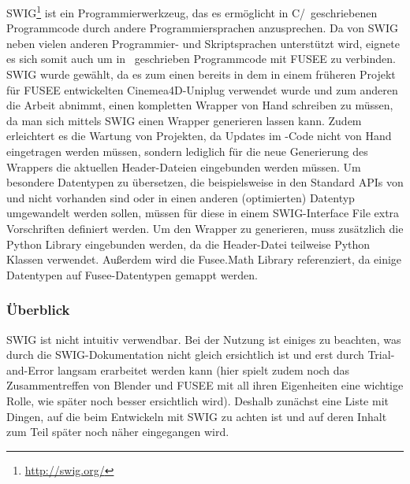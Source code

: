 \label{sec:SWIG}

SWIG\footnote{\url{http://swig.org/}} ist ein Programmierwerkzeug, das es ermöglicht in C/\CC~geschriebenen Programmcode durch andere Programmiersprachen anzusprechen. Da \CS von SWIG neben vielen anderen Programmier- und Skriptsprachen unterstützt wird, eignete es sich somit auch um in \CC~geschrieben Programmcode mit FUSEE zu verbinden. SWIG wurde gewählt, da es zum einen bereits in dem in einem früheren Projekt für FUSEE entwickelten Cinemea4D-Uniplug verwendet wurde und zum anderen die Arbeit abnimmt, einen kompletten Wrapper von Hand schreiben zu müssen, da man sich mittels SWIG einen Wrapper generieren lassen kann. Zudem erleichtert es die Wartung von Projekten, da Updates im \CC-Code nicht von Hand eingetragen werden müssen, sondern lediglich für die neue Generierung des Wrappers die aktuellen Header-Dateien eingebunden werden müssen. Um besondere Datentypen zu übersetzen, die beispielsweise in den Standard APIs von \CC und \CS nicht vorhanden sind oder in einen anderen (optimierten) Datentyp umgewandelt werden sollen, müssen für diese in einem SWIG-Interface File extra Vorschriften definiert werden.
Um den Wrapper zu generieren, muss zusätzlich die Python Library eingebunden werden, da die Header-Datei teilweise Python Klassen verwendet. Außerdem wird die Fusee.Math Library referenziert, da einige Datentypen auf Fusee-Datentypen gemappt werden.

\subsubsection{Überblick}
SWIG ist nicht intuitiv verwendbar. Bei der Nutzung ist einiges zu beachten, was durch die SWIG-Dokumentation nicht gleich ersichtlich ist und erst durch Trial-and-Error langsam erarbeitet werden kann (hier spielt zudem noch das Zusammentreffen von Blender und FUSEE mit all ihren Eigenheiten eine wichtige Rolle, wie später noch besser ersichtlich wird). Deshalb zunächst eine Liste mit Dingen, auf die beim Entwickeln mit SWIG zu achten ist und auf deren Inhalt zum Teil später noch näher eingegangen wird.

